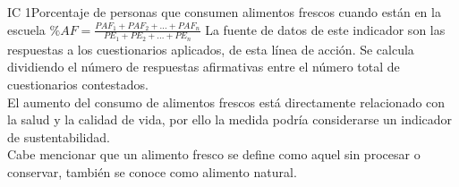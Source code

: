 \begin{indicador}{IC 1}{Porcentaje de personas que consumen alimentos frescos cuando están en la escuela}
	{$\%AF = \frac{PAF_1 + PAF_2 + ... + PAF_n}{PE_1 + PE_2 + ... + PE_n}$} 
	{
		La fuente de datos de este indicador son las respuestas a los cuestionarios aplicados, de esta línea de acción. Se calcula dividiendo el número de respuestas afirmativas entre el número total de cuestionarios contestados. \\
		
		El aumento del consumo de alimentos frescos está directamente relacionado con la salud y la calidad de vida,
		por ello la medida podría considerarse un  indicador de sustentabilidad. \\

		Cabe mencionar que un alimento fresco se define como aquel sin procesar o conservar, también se conoce como alimento natural.
	} 	
\end{indicador}
